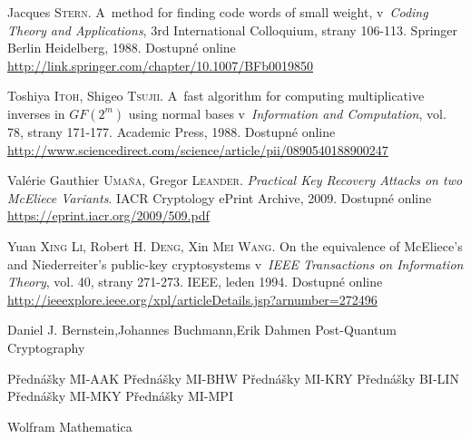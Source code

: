 \documentclass[thesis=M,czech,hidelinks]{FITthesis}[2012/06/26]
\newcommand{\0}{{\textcolor[gray]{0.80}{0}}}
\begin{document}
\begin{thebibliography}{99}
        Jacques \textsc{Stern}. A~method for finding code words of small weight,
        v~\emph{Coding Theory and Applications}, 3rd International Colloquium,
        strany 106-113. Springer Berlin Heidelberg, 1988. Dostupné online
        \url{http://link.springer.com/chapter/10.1007/BFb0019850}

        Toshiya \textsc{Itoh}, Shigeo \textsc{Tsujii}. A~fast algorithm for
        computing multiplicative inverses in $GF(2^m)$ using normal bases
        v~\emph{Information and Computation}, vol. 78, strany 171-177. Academic
        Press, 1988.  Dostupné online
        \url{http://www.sciencedirect.com/science/article/pii/0890540188900247}

        Valérie Gauthier \textsc{Umaña}, Gregor \textsc{Leander}.
        \emph{Practical Key Recovery Attacks on two McEliece Variants}.
        IACR Cryptology ePrint Archive, 2009.  Dostupné online
        \url{https://eprint.iacr.org/2009/509.pdf}

        Yuan \textsc{Xing Li}, Robert H. \textsc{Deng}, Xin \textsc{Mei Wang}.
        On the equivalence of McEliece's and Niederreiter's public-key
        cryptosystems v~\emph{IEEE Transactions on Information Theory}, vol. 40,
        strany 271-273. IEEE, leden 1994. Dostupné online
        \url{http://ieeexplore.ieee.org/xpl/articleDetails.jsp?arnumber=272496}

        Daniel J. Bernstein,Johannes Buchmann,Erik Dahmen
        Post-Quantum Cryptography

     Přednášky MI-AAK
     Přednášky MI-BHW
     Přednášky MI-KRY
     Přednášky BI-LIN
     Přednášky MI-MKY
     Přednášky MI-MPI

     Wolfram Mathematica
\end{thebibliography}

\appendix

\end{document}
